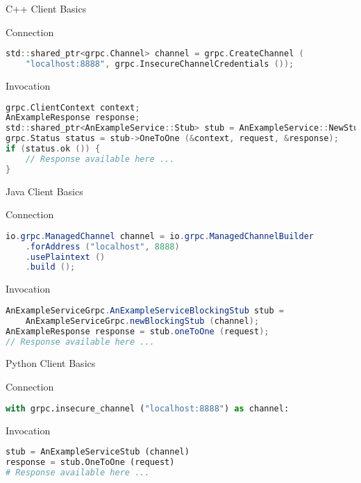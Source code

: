 \begin{frame}[fragile]{C++ Client Basics}
    \begin{block}{Connection}
\begin{lstlisting}[language=c,style=mini]
std::shared_ptr<grpc.Channel> channel = grpc.CreateChannel (
    "localhost:8888", grpc.InsecureChannelCredentials ());
\end{lstlisting}
    \end{block}

    \bigskip

    \begin{block}{Invocation}
\begin{lstlisting}[language=c,style=mini]
grpc.ClientContext context;
AnExampleResponse response;
std::shared_ptr<AnExampleService::Stub> stub = AnExampleService::NewStub (channel);
grpc.Status status = stub->OneToOne (&context, request, &response);
if (status.ok ()) {
    // Response available here ...
}
\end{lstlisting}
    \end{block}
\end{frame}


\begin{frame}[fragile]{Java Client Basics}
    \begin{block}{Connection}
\begin{lstlisting}[language=java,style=mini]
io.grpc.ManagedChannel channel = io.grpc.ManagedChannelBuilder
    .forAddress ("localhost", 8888)
    .usePlaintext ()
    .build ();
\end{lstlisting}
    \end{block}

    \bigskip

    \begin{block}{Invocation}
\begin{lstlisting}[language=java,style=mini]
AnExampleServiceGrpc.AnExampleServiceBlockingStub stub =
    AnExampleServiceGrpc.newBlockingStub (channel);
AnExampleResponse response = stub.oneToOne (request);
// Response available here ...
\end{lstlisting}
    \end{block}
\end{frame}


\begin{frame}[fragile]{Python Client Basics}
    \begin{block}{Connection}
\begin{lstlisting}[language=python,style=mini]
with grpc.insecure_channel ("localhost:8888") as channel:
\end{lstlisting}
    \end{block}

    \bigskip

    \begin{block}{Invocation}
\begin{lstlisting}[language=python,style=mini]
stub = AnExampleServiceStub (channel)
response = stub.OneToOne (request)
# Response available here ...
\end{lstlisting}
    \end{block}
\end{frame}


